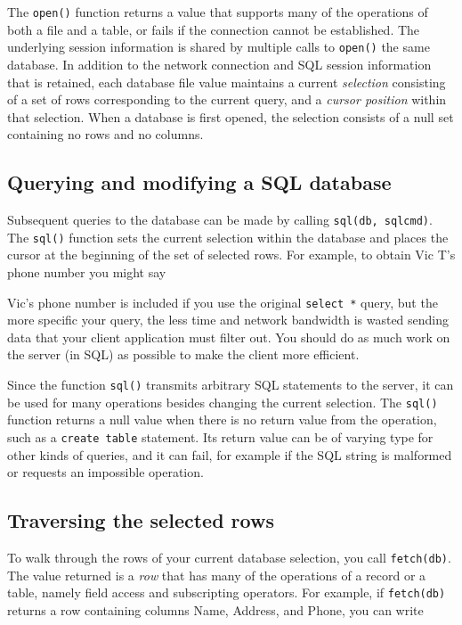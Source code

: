 
The \texttt{open()} function returns a value that supports many of the
operations of both a file and a table, or fails if the connection
cannot be established. The underlying session information is shared by
multiple calls to \texttt{open()} the same database. In addition to
the network connection and SQL session information that is retained,
each database file value maintains a current \textit{selection}
consisting of a set of rows corresponding to the current query, and a
\textit{cursor position} within that selection. When a database is
first opened, the selection consists of a null set containing no rows
and no columns.

\subsection*{Querying and modifying a SQL database}

Subsequent queries to the database can be made by calling
\texttt{sql(db, sqlcmd)}. The \texttt{sql()} function sets
the current selection within the database and places the cursor at the
beginning of the set of selected rows. For example, to obtain Vic
T's phone number you might say


Vic's phone number is included if you use the original
\texttt{select *} query, but the more specific your query, the less
time and network bandwidth is wasted sending data that your client
application must filter out. You should do as much work on the server
(in SQL) as possible to make the client more efficient.

Since the function \texttt{sql()} transmits arbitrary SQL statements to
the server, it can be used for many operations besides changing the
current selection. The \texttt{sql()} function returns a null value
when there is no return value from the operation, such as a
\texttt{create table} statement. Its return value can be of varying
type for other kinds of queries, and it can fail, for example if the
SQL string is malformed or requests an impossible operation.

\subsection*{Traversing the selected rows}

To walk through the rows of your current database selection, you call
\texttt{fetch(db)}. The value returned is a
\textit{row} that has many of the operations of a record or a table,
namely field access and subscripting operators. For example, if
\texttt{fetch(db)} returns a row containing columns Name, Address, and
Phone, you can write

